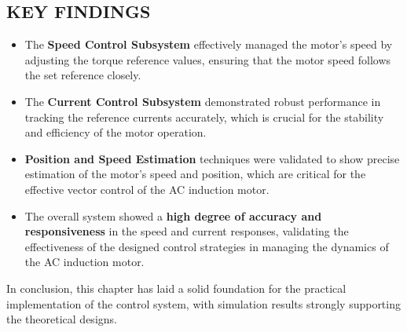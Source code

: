 \subsection{KEY FINDINGS}

\begin{itemize}
    \item The \textbf{Speed Control Subsystem} effectively managed the motor's speed by adjusting the torque reference values, ensuring that the motor speed follows the set reference closely.
    \item The \textbf{Current Control Subsystem} demonstrated robust performance in tracking the reference currents accurately, which is crucial for the stability and efficiency of the motor operation.
    \item \textbf{Position and Speed Estimation} techniques were validated to show precise estimation of the motor's speed and position, which are critical for the effective vector control of the AC induction motor.
    \item The overall system showed a \textbf{high degree of accuracy and responsiveness} in the speed and current responses, validating the effectiveness of the designed control strategies in managing the dynamics of the AC induction motor.
\end{itemize}

In conclusion, this chapter has laid a solid foundation for the practical implementation of the control system, with simulation results strongly supporting the theoretical designs.


\newpage